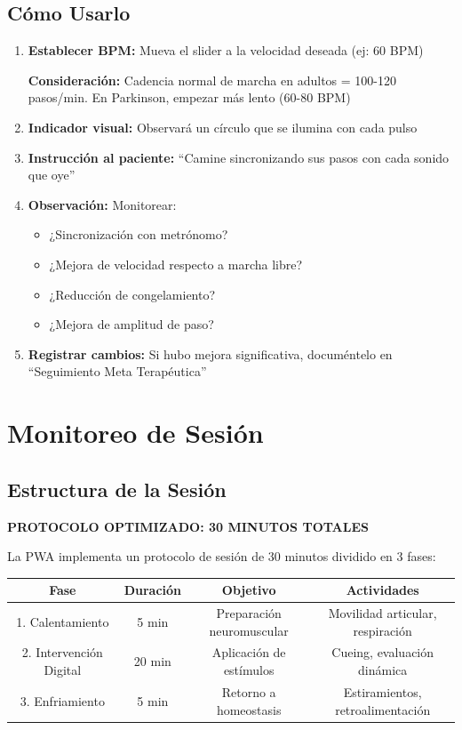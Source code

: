 \documentclass[12pt,a4paper,spanish,oneside]{book}
\begin{document}
\subsection{Cómo Usarlo}

\begin{enumerate}
  \item \textbf{Establecer BPM:} Mueva el slider a la velocidad deseada (ej: 60 BPM)
  
  \textbf{Consideración:} Cadencia normal de marcha en adultos = 100-120 pasos/min. En Parkinson, empezar más lento (60-80 BPM)
  
  \item \textbf{Indicador visual:} Observará un círculo que se ilumina con cada pulso
  
  \item \textbf{Instrucción al paciente:} ``Camine sincronizando sus pasos con cada sonido que oye''
  
  \item \textbf{Observación:} Monitorear:
  \begin{itemize}
    \item ¿Sincronización con metrónomo?
    \item ¿Mejora de velocidad respecto a marcha libre?
    \item ¿Reducción de congelamiento?
    \item ¿Mejora de amplitud de paso?
  \end{itemize}
  
  \item \textbf{Registrar cambios:} Si hubo mejora significativa, documéntelo en ``Seguimiento Meta Terapéutica''
\end{enumerate}

\section{Monitoreo de Sesión}

\subsection{Estructura de la Sesión}

\textbf{PROTOCOLO OPTIMIZADO: 30 MINUTOS TOTALES}

La PWA implementa un protocolo de sesión de 30 minutos dividido en 3 fases:

\begin{table}[h]
  \centering
  \begin{tabular}{|c|c|c|c|}
    \hline
    \textbf{Fase} & \textbf{Duración} & \textbf{Objetivo} & \textbf{Actividades} \\
    \hline
    1. Calentamiento & 5 min & Preparación neuromuscular & Movilidad articular, respiración \\
    \hline
    2. Intervención Digital & 20 min & Aplicación de estímulos & Cueing, evaluación dinámica \\
    \hline
    3. Enfriamiento & 5 min & Retorno a homeostasis & Estiramientos, retroalimentación \\
    \hline
  \end{tabular}
\end{table}
\end{document}
